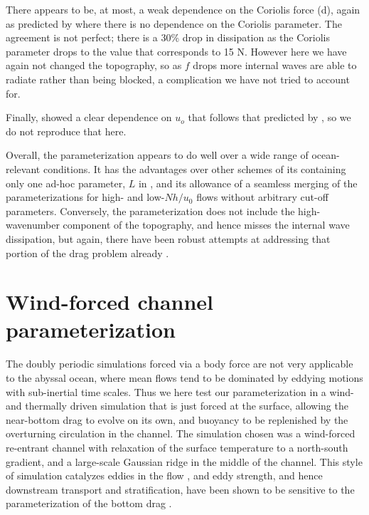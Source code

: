 \documentclass[twocol]{ametsocV5}
\begin{document}
There appears to be, at most, a weak dependence on the Coriolis force (d), again as predicted by  where there is no dependence on the Coriolis parameter.  The agreement is not perfect; there is a 30\% drop in dissipation as the Coriolis parameter drops to the value that corresponds to 15 N.  However here we have again not changed the topography, so as $f$ drops more internal waves are able to radiate rather than being blocked, a complication we have not tried to account for.

Finally, \citet{klymak18} showed a clear dependence on $u_o$  that follows that predicted by , so we do not reproduce that here.

Overall, the parameterization appears to do well over a wide range of ocean-relevant conditions.  It has the advantages over other schemes of its containing only one ad-hoc parameter, $L$ in , and its allowance of a seamless merging of the parameterizations for high- and low-$Nh/u_0$ flows without arbitrary cut-off parameters.  Conversely, the parameterization does not include the high-wavenumber component of the topography, and hence misses the internal wave dissipation, but again, there have been robust attempts at addressing  that portion of the drag problem already \citep{nikurashinferrari14}.

\section{Wind-forced channel parameterization}
\label{sec:ResultsWindForcing}

The doubly periodic simulations forced via a body force are not very applicable to the abyssal ocean, where mean flows tend to be dominated by eddying motions with sub-inertial time scales.  Thus we here test our parameterization in a wind- and thermally driven simulation that is just forced at the surface, allowing the near-bottom drag to evolve on its own, and buoyancy to be replenished by the overturning circulation in the channel.  The simulation chosen was a wind-forced re-entrant channel with relaxation of the surface temperature to a north-south gradient, and a large-scale Gaussian ridge in the middle of the channel.  This style of simulation catalyzes eddies in the flow \citep{abernatheycessi14}, and eddy strength, and hence downstream transport and stratification, have been shown to be sensitive to the parameterization of the bottom drag \citep{Marshall_2017}.
\end{document}
